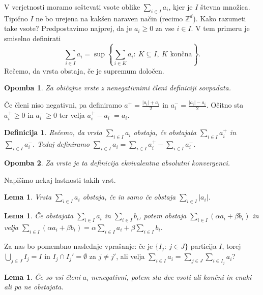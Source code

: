 \documentclass[10pt, a4paper]{article}
\newtheorem{defi}[izr]{Definicija}
\newenvironment{noticeB}{%
  \tcolorbox[%
  notitle,
  empty,
  enhanced,  %
  breakable,
  coltext=black,
  colback=white, 
  fontupper=\rmfamily,
  parbox=false,
  noparskip,
  sharp corners,
  boxrule=-1pt,  %
  frame hidden,
  left=7pt,  %
  right=7pt,
  top=5pt,
  bottom=5pt,
  before skip=2.5ex plus 2pt,
  after skip=2.5ex plus 2pt,
  borderline west = {1.5pt}{-0.1pt}{blue!30!black}, %
  overlay unbroken and last={%
    \draw[color=black, line width=1.25pt]
    ($(frame.south west)+(1.pt, -0.1pt)$) -- ++(2em, 0);
  }
  ]}
{\endtcolorbox}
\newenvironment{definicija}{\begin{defi}\begin{noticeB}}{%
    \end{noticeB}\end{defi}}
\newtheorem*{opomba}{Opomba}
\newtheorem{lema}[izr]{Lema}
\newcommand{\Z}{\mathbb {Z}}
\begin{document}
V verjetnosti moramo seštevati vsote oblike $\sum_{i \in I} a_i$,
kjer je $I$ števna množica. Tipično $I$ ne bo urejena na kakšen naraven način 
(recimo $\Z^d$). Kako razumeti take vsote? Predpostavimo najprej, da je $a_i \geq 0$ za vse $i \in I$.
V tem primeru je smiselno definirati 
$$\sum_{i \in I} a_i = \sup \left\lbrace \sum_{i \in K} a_i:\ K \subseteq I,\ \text{$K$ končna} \right\rbrace.$$
Rečemo, da vrsta obstaja, če je supremum določen.

\begin{opomba}
  Za običajne vrste z nenegativnimi členi definiciji sovpadata.
\end{opomba}

Če členi niso negativni, pa definiramo $a^+ = \frac{|a_i| + a_i}{2}$ in $a_i^- = \frac{|a_i| - a_i}{2}$.
Očitno sta $a_i ^+ \geq 0$ in $a_i^- \geq 0$ ter velja $a_i^+ - a_i^- = a_i$.

\begin{definicija}
  Rečemo, da vrsta $\sum_{i \in I} a_i$ obstaja, če obstajata $\sum_{i \in I}a_i^+$ in $\sum_{i \in I} a_i^-$.
  Tedaj definiramo $\sum_{i \in I} a_i = \sum_{i \in I} a_i^+ - \sum_{i \in I} a_i^-$. 
\end{definicija}

\begin{opomba}
  Za vrste je ta definicija ekvivalentna absolutni konvergenci.
\end{opomba}

Napišimo nekaj lastnosti takih vrst.

\begin{lema}
  Vrsta $\sum_{i \in I} a_i$ obstaja, če in samo če obstaja $\sum_{i \in I} |a_i|$.
\end{lema}

\begin{lema}
  Če obstajata $\sum_{i \in I} a_i$ in $\sum_{i \in I} b_i$, potem obstaja $\sum_{i \in I} (\alpha a_i + \beta b_i)$
  in velja $\sum_{i \in I} (\alpha a_i + \beta b_i) = \alpha \sum_{i \in I} a_i + \beta \sum_{i \in I} b_i.$ 
\end{lema}

Za nas bo pomembno naslednje vprašanje: če je $\{I_j:\ j \in J\}$ particija $I$,
torej $\bigcup_{j \in J} I_j = I$ in $I_j \cap I_j' = \emptyset$ za $j \neq j'$,
ali velja $\sum_{i \in I} a_i = \sum_{j \in J} \sum_{i \in I_j} a_i$?

\begin{lema}
  Če so vsi členi $a_i$ nenegativni, potem sta dve vsoti ali končni in enaki ali pa ne obstajata.
\end{lema}
\end{document}
